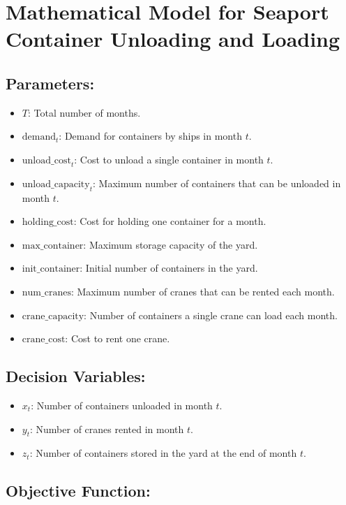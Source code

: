 \documentclass{article}
\begin{document}
\section*{Mathematical Model for Seaport Container Unloading and Loading}

\subsection*{Parameters:}

\begin{itemize}
    \item $T$: Total number of months.
    \item $\text{demand}_t$: Demand for containers by ships in month $t$.
    \item $\text{unload\_cost}_t$: Cost to unload a single container in month $t$.
    \item $\text{unload\_capacity}_t$: Maximum number of containers that can be unloaded in month $t$.
    \item $\text{holding\_cost}$: Cost for holding one container for a month.
    \item $\text{max\_container}$: Maximum storage capacity of the yard.
    \item $\text{init\_container}$: Initial number of containers in the yard.
    \item $\text{num\_cranes}$: Maximum number of cranes that can be rented each month.
    \item $\text{crane\_capacity}$: Number of containers a single crane can load each month.
    \item $\text{crane\_cost}$: Cost to rent one crane.
\end{itemize}

\subsection*{Decision Variables:}

\begin{itemize}
    \item $x_t$: Number of containers unloaded in month $t$.
    \item $y_t$: Number of cranes rented in month $t$.
    \item $z_t$: Number of containers stored in the yard at the end of month $t$.
\end{itemize}

\subsection*{Objective Function:}
\end{document}
